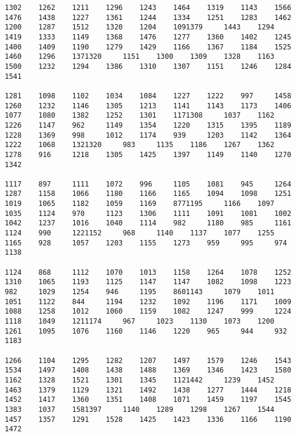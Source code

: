 \begin{verbatim}
1302    1262    1211    1296    1243    1464    1319    1143    1566    1476    1438    1227    1361    1244    1334    1251    1283    1462    1200    1287    1512    1320    1204    1091379     1443    1294    1419    1333    1149    1368    1476    1277    1360    1402    1245    1400    1409    1190    1279    1429    1166    1367    1184    1525    1460    1296    1371320     1151    1300    1309    1328    1163    1500    1232    1294    1386    1310    1307    1151    1246    1284    1541

1281    1098    1102    1034    1084    1227    1222    997     1458    1260    1232    1146    1305    1213    1141    1143    1173    1406    1077    1080    1382    1252    1301    1171308     1037    1162    1226    1147    962     1149    1354    1220    1315    1395    1189    1228    1369    998     1012    1174    939     1203    1142    1364    1222    1068    1321320     983     1135    1186    1267    1362    1278    916     1218    1305    1425    1397    1149    1140    1270    1342

1117    897     1111    1072    996     1105    1081    945     1264    1287    1158    1066    1180    1166    1165    1094    1098    1251    1019    1065    1182    1059    1169    8771195     1166    1097    1035    1124    970     1123    1306    1111    1091    1081    1002    1042    1237    1016    1040    1114    982     1180    985     1161    1124    990     1221152     968     1140    1137    1077    1255    1165    928     1057    1203    1155    1273    959     995     974     1138

1124    868     1112    1070    1013    1158    1264    1078    1252    1310    1065    1193    1125    1147    1147    1082    1098    1223    982     1029    1254    946     1195    8601143     1079    1011    1051    1122    844     1194    1232    1092    1196    1171    1009    1088    1258    1012    1060    1159    1082    1247    999     1224    1118    1049    1211174     967     1023    1130    1073    1200    1261    1095    1076    1160    1146    1220    965     944     932     1183

1266    1104    1295    1282    1207    1497    1579    1246    1543    1534    1497    1408    1438    1488    1369    1346    1423    1580    1162    1328    1521    1301    1345    1121442     1239    1452    1463    1379    1129    1321    1492    1438    1277    1444    1218    1452    1417    1360    1351    1408    1071    1459    1197    1545    1383    1037    1581397     1140    1289    1298    1267    1544    1457    1357    1291    1528    1425    1423    1336    1166    1190    1472


\end{verbatim}
